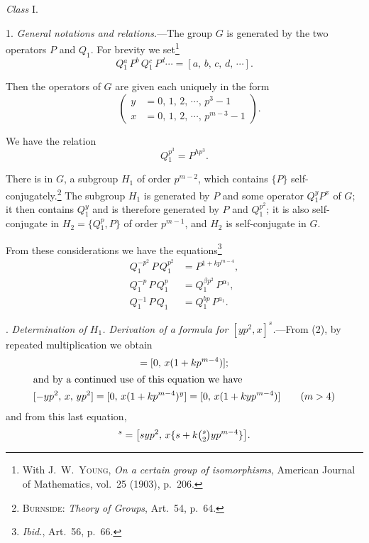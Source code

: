 \documentclass[oneside]{article}
\begin{document}
\bigskip \bigskip
\begin{center}
\Large\textit{Class} I.\normalsize
\end{center}

1. \textit{General notations and relations.}---The group $G$ is
generated by the two operators $P$ and $Q_1$. For brevity we
set\footnote{With J.~W.\ \textsc{Young}, \textit{On a certain
group of isomorphisms}, American Journal of Mathematics, vol.\ 25
(1903), p.\ 206.}
\begin{equation*}
Q{}_1^a\, P^b\, Q{}_1^c\, P^d \cdots = [a,\, b,\, c,\, d,\, \cdots].
\end{equation*}

Then the operators of $G$ are given each uniquely in the form
\begin{equation*}
[y,\, x] \quad \left( \begin{aligned}y &= 0,\, 1,\, 2,\, \cdots,\, p^3-1 \\
                                     x &= 0,\, 1,\, 2,\, \cdots,\, p^{m-3}-1
                      \end{aligned} \right) .
\end{equation*}

We have the relation
\begin{equation}
Q{}_1^{p^3} = P^{hp^3}. %
\end{equation}

\noindent There is in $G$, a subgroup $H_1$ of order $p^{m-2}$, which
contains $\{P\}$ self-con\-ju\-gate\-ly.\footnote{\textsc{Burnside}:
\textit{Theory of Groups}, Art.\ 54, p.\ 64.} The subgroup $H_1$ is
generated by $P$ and some operator $Q{}_1^y P^x$ of $G$; it then
contains $Q{}_1^y$ and is therefore generated by $P$ and
$Q{}_1^{p^2}$; it is also self-conjugate in $H_2 = \{Q{}_1^p, P\}$
of order $p^{m-1}$, and $H_2$ is self-conjugate in $G$.

From these considerations we have the
equations\footnote{\textit{Ibid.}, Art.\ 56, p.\ 66.}
\begin{align}
Q{}_1^{-p^2}\,P\,Q{}_1^{p^2} &= P^{1+kp^{m-4}}, \\ %
Q{}_1^{-p}\,P\,Q{}_1^p &= Q{}_1^{\beta p^2}\,P^{\alpha_1}, \\ %
Q{}_1^{-1}\,P\,Q_1 &= Q{}_1^{bp}\,P^{a_1}. %
\end{align}

. \textit{Determination of $H_1$. Derivation of a formula for
$[yp^2, x]^s$.}---From (2), by repeated multiplication we obtain
\begin{gather*}
[-p^2,\, x,\, p^2] = [0,\, x(1 + kp^{m-4})]; \\
\intertext{and by a continued use of this equation we have}
[-yp^2,\, x,\, yp^2] = [0,\, x(1 + kp^{m-4})^y] = [0,\, x(1 + kyp^{m-4})] \qquad (m > 4)
\end{gather*}
\noindent and from this last equation,
\begin{equation}
[yp^2,\, x]^s = \bigl[syp^2,\, x\{s + k \tbinom{s}{2}yp^{m-4}\}\bigr]. %
\end{equation}
\end{document}
